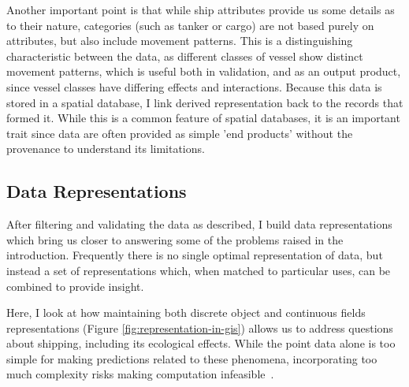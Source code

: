 \documentclass[12pt,letterpaper]{article}
\begin{document}

Another important point is that while ship attributes provide us some details as to their nature, categories (such as tanker or cargo) are not based purely on attributes, but also include movement patterns. This is a distinguishing characteristic between the data, as different classes of vessel show distinct movement patterns, which is useful both in validation, and as an output product, since vessel classes have differing effects and interactions. Because this data is stored in a spatial database, I link derived representation back to the records that formed it. While this is a common feature of spatial databases, it is an important trait since data are often provided as simple 'end products' without the provenance to understand its limitations.



\subsection{Data Representations}


After filtering and validating the data as described, I build data representations which bring us closer to answering some of the problems raised in the introduction. Frequently there is no single optimal representation of data, but instead a set of representations which, when matched to particular uses, can be combined to provide insight.

Here, I look at how maintaining both discrete object and continuous fields representations (Figure \ref{fig:representation-in-gis}) allows us to address questions about shipping, including its ecological effects. While the point data alone is too simple for making predictions related to these phenomena, incorporating too much complexity risks making computation infeasible~\citep{de2007geospatial}.
\end{document}
